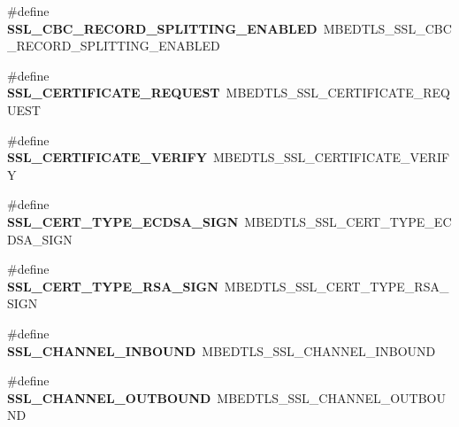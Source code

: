 \begin{DoxyCompactItemize}
\item 
\mbox{\label{compat-1_83_8h_abe2e17d73716b55f0436437692933ede}} 
\#define {\bfseries S\+S\+L\+\_\+\+C\+B\+C\+\_\+\+R\+E\+C\+O\+R\+D\+\_\+\+S\+P\+L\+I\+T\+T\+I\+N\+G\+\_\+\+E\+N\+A\+B\+L\+ED}~M\+B\+E\+D\+T\+L\+S\+\_\+\+S\+S\+L\+\_\+\+C\+B\+C\+\_\+\+R\+E\+C\+O\+R\+D\+\_\+\+S\+P\+L\+I\+T\+T\+I\+N\+G\+\_\+\+E\+N\+A\+B\+L\+ED
\item 
\mbox{\label{compat-1_83_8h_aabdd2458ee6fc9f98f9b65a4720e0470}} 
\#define {\bfseries S\+S\+L\+\_\+\+C\+E\+R\+T\+I\+F\+I\+C\+A\+T\+E\+\_\+\+R\+E\+Q\+U\+E\+ST}~M\+B\+E\+D\+T\+L\+S\+\_\+\+S\+S\+L\+\_\+\+C\+E\+R\+T\+I\+F\+I\+C\+A\+T\+E\+\_\+\+R\+E\+Q\+U\+E\+ST
\item 
\mbox{\label{compat-1_83_8h_aff8f6f24abf55604a02839d7a1f2da99}} 
\#define {\bfseries S\+S\+L\+\_\+\+C\+E\+R\+T\+I\+F\+I\+C\+A\+T\+E\+\_\+\+V\+E\+R\+I\+FY}~M\+B\+E\+D\+T\+L\+S\+\_\+\+S\+S\+L\+\_\+\+C\+E\+R\+T\+I\+F\+I\+C\+A\+T\+E\+\_\+\+V\+E\+R\+I\+FY
\item 
\mbox{\label{compat-1_83_8h_ab82db2f8b69801caaff542cbb575f109}} 
\#define {\bfseries S\+S\+L\+\_\+\+C\+E\+R\+T\+\_\+\+T\+Y\+P\+E\+\_\+\+E\+C\+D\+S\+A\+\_\+\+S\+I\+GN}~M\+B\+E\+D\+T\+L\+S\+\_\+\+S\+S\+L\+\_\+\+C\+E\+R\+T\+\_\+\+T\+Y\+P\+E\+\_\+\+E\+C\+D\+S\+A\+\_\+\+S\+I\+GN
\item 
\mbox{\label{compat-1_83_8h_a6251d055d62aa78961d06540a64a87e0}} 
\#define {\bfseries S\+S\+L\+\_\+\+C\+E\+R\+T\+\_\+\+T\+Y\+P\+E\+\_\+\+R\+S\+A\+\_\+\+S\+I\+GN}~M\+B\+E\+D\+T\+L\+S\+\_\+\+S\+S\+L\+\_\+\+C\+E\+R\+T\+\_\+\+T\+Y\+P\+E\+\_\+\+R\+S\+A\+\_\+\+S\+I\+GN
\item 
\mbox{\label{compat-1_83_8h_a04a1d820c9add2558a6547fb6c78c32a}} 
\#define {\bfseries S\+S\+L\+\_\+\+C\+H\+A\+N\+N\+E\+L\+\_\+\+I\+N\+B\+O\+U\+ND}~M\+B\+E\+D\+T\+L\+S\+\_\+\+S\+S\+L\+\_\+\+C\+H\+A\+N\+N\+E\+L\+\_\+\+I\+N\+B\+O\+U\+ND
\item 
\mbox{\label{compat-1_83_8h_a7727c38450419bb4415e4d69fd3a85e6}} 
\#define {\bfseries S\+S\+L\+\_\+\+C\+H\+A\+N\+N\+E\+L\+\_\+\+O\+U\+T\+B\+O\+U\+ND}~M\+B\+E\+D\+T\+L\+S\+\_\+\+S\+S\+L\+\_\+\+C\+H\+A\+N\+N\+E\+L\+\_\+\+O\+U\+T\+B\+O\+U\+ND

\end{DoxyCompactItemize}
